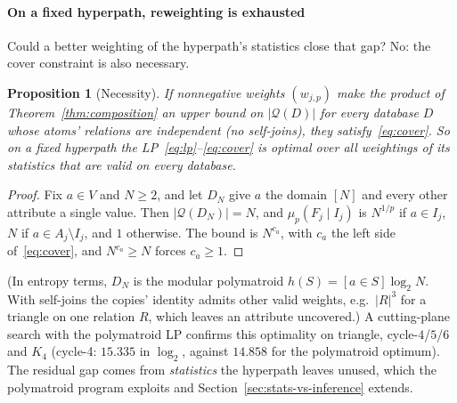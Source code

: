 \documentclass[sigconf, nonacm, acmthm=false]{acmart}
\newcommand{\query}{\mathcal{Q}}
\newcommand{\block}{F}
\newcommand{\interface}{I}
\newcommand{\muLp}[3]{\mu_{#1}(#2 \mid #3)}
\newtheorem{proposition}[theorem]{Proposition}
\begin{document}
\paragraph{On a fixed hyperpath, reweighting is exhausted}
Could a better weighting of the hyperpath's statistics close that gap?
No: the cover constraint is also necessary.

\begin{proposition}[Necessity]
\label{prop:necessity}
If nonnegative weights $(w_{j,p})$ make the product of
Theorem~\ref{thm:composition} an upper bound on $|\query(D)|$ for every database $D$ whose atoms' relations are independent (no self-joins), they satisfy~\eqref{eq:cover}. So on a fixed hyperpath the
LP~\eqref{eq:lp}--\eqref{eq:cover} is optimal over all weightings of its
statistics that are valid on every database.
\end{proposition}

\begin{proof}
Fix $a\in V$ and $N\ge2$, and let $D_N$ give $a$ the domain $[N]$ and
every other attribute a single value. Then $|\query(D_N)|=N$, and
$\muLp{p}{\block_j}{\interface_j}$ is $N^{1/p}$ if $a\in\interface_j$, $N$
if $a\in A_j\setminus\interface_j$, and $1$ otherwise. The bound is
$N^{c_a}$, with $c_a$ the left side of~\eqref{eq:cover}, and
$N^{c_a}\ge N$ forces $c_a\ge1$.
\end{proof}

\noindent (In entropy terms, $D_N$ is the modular polymatroid $h(S)=[a\in S]\log_2N$. With self-joins the copies' identity admits other valid weights, e.g.\ $|R|^3$ for a triangle on one relation $R$, which leaves an attribute uncovered.) A cutting-plane search with the polymatroid LP
confirms this optimality on triangle, cycle-$4$/$5$/$6$ and $K_4$ (cycle-4: $15.335$
in $\log_2$, against $14.858$ for the polymatroid optimum). The residual
gap comes from \emph{statistics} the hyperpath leaves unused, which the
polymatroid program exploits and Section~\ref{sec:stats-vs-inference}
extends.
\end{document}
